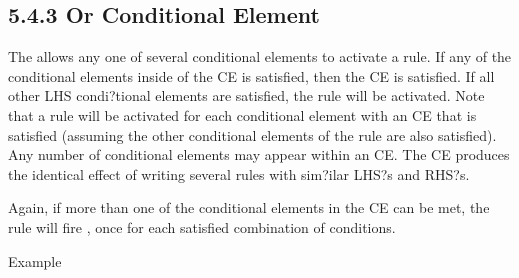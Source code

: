 \documentclass[letterpaper,10pt,english]{sphinxmanual}
\begin{document}
\subsection{5.4.3 Or Conditional Element}
\label{\detokenize{defrule:or-conditional-element}}
The  allows any one of several conditional
elements to activate a rule. If any of the conditional elements inside
of the  CE is satisfied, then the  CE is satisfied. If all
other LHS condi?tional elements are satisfied, the rule will be
activated. Note that a rule will be activated for each conditional
element with an  CE that is satisfied (assuming the other
conditional elements of the rule are also satisfied). Any number of
conditional elements may appear within an  CE. The  CE
produces the identical effect of writing several rules with sim?ilar
LHS?s and RHS?s.


\begin{sphinxVerbatim}[commandchars=\\\{\}]
   
\end{sphinxVerbatim}

Again, if more than one of the conditional elements in the  CE can
be met, the rule will fire , once for each satisfied
combination of conditions.

Example

\begin{sphinxVerbatim}[commandchars=\\\{\}]
 
   
    
       
        
     
\end{sphinxVerbatim}
\end{document}
